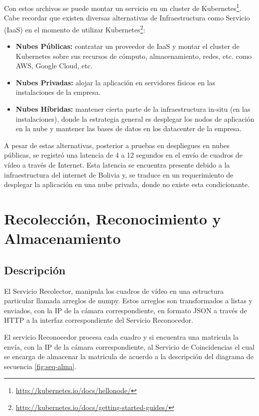 Con estos archivos se puede montar un servicio en un cluster de Kubernetes\footnote{\url{http://kubernetes.io/docs/hellonode/}}. Cabe recordar que existen diversas alternativas de Infraestructura como Servicio (IaaS) en el momento de utilizar Kubernetes\footnote{\url{http://kubernetes.io/docs/getting-started-guides/}}:
\begin{itemize}
\item \textbf{Nubes Públicas:} contratar un proveedor de IaaS y montar el cluster de Kubernetes sobre sus recursos de cómputo, almacenamiento, redes, etc. como AWS, Google Cloud, etc.
\item \textbf{Nubes Privadas:} alojar la aplicación en servidores físicos en las instalaciones de la empresa.
\item \textbf{Nubes Híbridas:} mantener cierta parte de la infraestructura in-situ (en las instalaciones), donde la estrategia general es desplegar los nodos de aplicación en la nube y mantener las bases de datos en los datacenter de la empresa.
 \end{itemize}
A pesar de estas alternativas, posterior a pruebas en despliegues en nubes públicas, se registró una latencia de 4 a 12 segundos en el envío de cuadros de vídeo a través de Internet. Esta latencia se encuentra presente debido a la infraestructura del internet de Bolivia y, se traduce en un requerimiento de desplegar la aplicación en una nube privada, donde no existe esta condicionante.

\section{Recolección, Reconocimiento y Almacenamiento}
\subsection{Descripción}

El Servicio Recolector, manipula los cuadros de vídeo en una estructura particular llamada arreglos de numpy. Estos arreglos son transformados a listas y enviados, con la IP de la cámara correspondiente, en formato JSON a través de HTTP a la interfaz correspondiente del Servicio Reconocedor.

El servicio Reconocedor procesa cada cuadro y si encuentra una matricula la envía, con la IP de la cámara correspondiente, al Servicio de Coincidencias el cual se encarga de almacenar la matricula de acuerdo a la descripción del diagrama de secuencia \ref{fig:seq-alma}.

